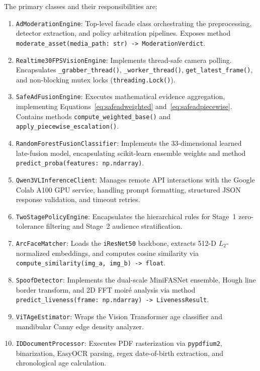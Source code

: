 \documentclass[12pt,a4paper]{report}
\begin{document}
The primary classes and their responsibilities are:
\begin{enumerate}
    \item \texttt{AdModerationEngine}: Top-level facade class orchestrating the preprocessing, detector extraction, and policy arbitration pipelines. Exposes method \texttt{moderate\_asset(media\_path: str) -> ModerationVerdict}.
    \item \texttt{Realtime30FPSVisionEngine}: Implements thread-safe camera polling. Encapsulates \texttt{\_grabber\_thread()}, \texttt{\_worker\_thread()}, \texttt{get\_latest\_frame()}, and non-blocking mutex locks (\texttt{threading.Lock()}).
    \item \texttt{SafeAdFusionEngine}: Executes mathematical evidence aggregation, implementing Equations~\ref{eq:safeadweighted} and~\ref{eq:safeadpiecewise}. Contains methods \texttt{compute\_weighted\_base()} and \texttt{apply\_piecewise\_escalation()}.
    \item \texttt{RandomForestFusionClassifier}: Implements the 33-dimensional learned late-fusion model, encapsulating scikit-learn ensemble weights and method \texttt{predict\_proba(features: np.ndarray)}.
    \item \texttt{Qwen3VLInferenceClient}: Manages remote API interactions with the Google Colab A100 GPU service, handling prompt formatting, structured JSON response validation, and timeout retries.
    \item \texttt{TwoStagePolicyEngine}: Encapsulates the hierarchical rules for Stage~1 zero-tolerance filtering and Stage~2 audience stratification.
    \item \texttt{ArcFaceMatcher}: Loads the \texttt{iResNet50} backbone, extracts 512-D $L_2$-normalized embeddings, and computes cosine similarity via \texttt{compute\_similarity(img\_a, img\_b) -> float}.
    \item \texttt{SpoofDetector}: Implements the dual-scale MiniFASNet ensemble, Hough line border transform, and 2D FFT moir\'{e} analysis via method \texttt{predict\_liveness(frame: np.ndarray) -> LivenessResult}.
    \item \texttt{ViTAgeEstimator}: Wraps the Vision Transformer age classifier and mandibular Canny edge density analyzer.
    \item \texttt{IDDocumentProcessor}: Executes PDF rasterization via \texttt{pypdfium2}, binarization, EasyOCR parsing, regex date-of-birth extraction, and chronological age calculation.
\end{enumerate}
\end{document}
